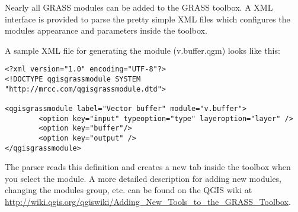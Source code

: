 Nearly all GRASS modules can be added to the GRASS toolbox. A XML 
interface is provided to parse the pretty simple XML files which configures 
the modules appearance and parameters inside the toolbox.

A sample XML file for generating the module  (v.buffer.qgm) 
looks like this:
\begin{verbatim}
<?xml version="1.0" encoding="UTF-8"?>
<!DOCTYPE qgisgrassmodule SYSTEM "http://mrcc.com/qgisgrassmodule.dtd">

<qgisgrassmodule label="Vector buffer" module="v.buffer">
        <option key="input" typeoption="type" layeroption="layer" />
        <option key="buffer"/>
        <option key="output" />
</qgisgrassmodule>
\end{verbatim}

The parser reads this definition and creates a new tab inside the toolbox 
when you select the module. A more detailed description for adding new 
modules, changing the modules group, etc. can be found on the QGIS wiki at \\
\url{http://wiki.qgis.org/qgiswiki/Adding\_New\_Tools\_to\_the\_GRASS\_Toolbox}.

